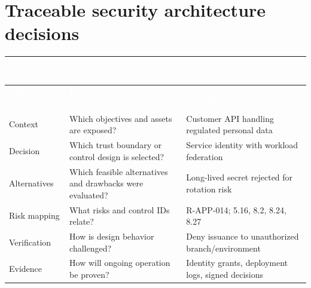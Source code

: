 \documentclass[11pt,letterpaper]{article}
\begin{document}
\section{Traceable security architecture decisions}
\small{}\begin{longtable}{>{\raggedright\arraybackslash}p{}>{\raggedright\arraybackslash}p{}>{\raggedright\arraybackslash}p{}}
\rowcolor{navy} \textcolor{white}{\textbf{AD record field}} & \textcolor{white}{\textbf{Required engineering question}} & \textcolor{white}{\textbf{Example}}\\
\endfirsthead
\rowcolor{navy} \textcolor{white}{\textbf{AD record field}} & \textcolor{white}{\textbf{Required engineering question}} & \textcolor{white}{\textbf{Example}}\\
\endhead
Context & Which objectives and assets are exposed? & Customer API handling regulated personal data\\
Decision & Which trust boundary or control design is selected? & Service identity with workload federation\\
Alternatives & Which feasible alternatives and drawbacks were evaluated? & Long-lived secret rejected for rotation risk\\
Risk mapping & What risks and control IDs relate? & R-APP-014; 5.16, 8.2, 8.24, 8.27\\
Verification & How is design behavior challenged? & Deny issuance to unauthorized branch/environment\\
Evidence & How will ongoing operation be proven? & Identity grants, deployment logs, signed decisions\\
\end{longtable}\normalsize
\end{document}
